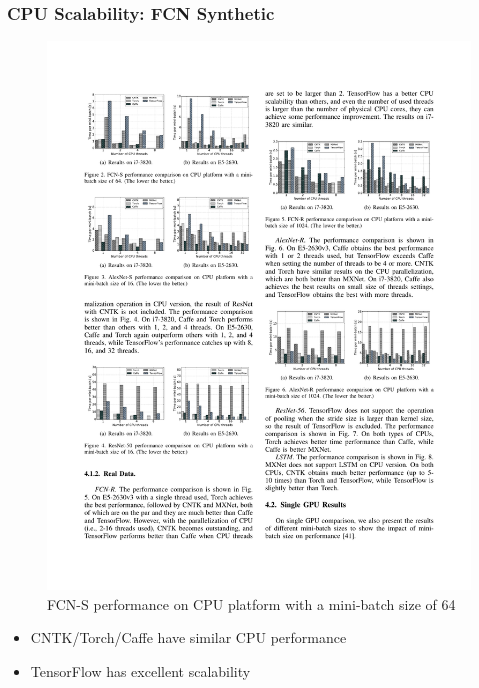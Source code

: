 \begin{frame}
	\MyLogo
	\frametitle{CPU Scalability: FCN Synthetic}  

\begin{figure}[htbp] 
	\includegraphics[width=\linewidth]{figures/FCN-S1.pdf} 
	\caption{FCN-S performance on CPU platform with a mini-batch size of 64}
\end{figure}

\pause

\vskip -10pt
\begin{mdframed}[style=mystyle1]
\begin{itemize}
\item CNTK/Torch/Caffe have similar CPU performance
\item TensorFlow has excellent scalability
\end{itemize}
\end{mdframed}

\end{frame}


